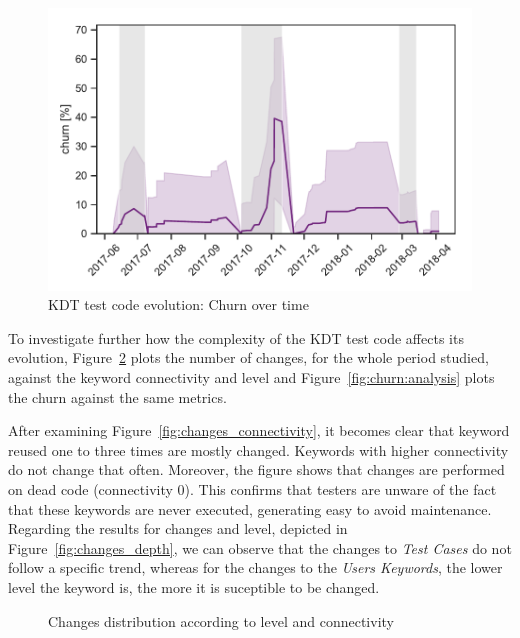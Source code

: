 \begin{figure}
\centering
\includegraphics[width=0.7\columnwidth]{figures/evolution/time_series_churn.pdf}
\caption{KDT test code evolution: Churn over time}  
\label{fig:churn}
\end{figure}

To investigate further how the complexity of the KDT test code affects its evolution, Figure~\ref{fig:changes} plots the number of changes, for the whole period studied, against the keyword connectivity and level and Figure~\ref{fig:churn:analysis} plots the churn against the same metrics.

After examining Figure~\ref{fig:changes_connectivity}, it becomes clear that keyword reused one to three times are mostly changed. Keywords with higher connectivity do not change that often. Moreover, the figure shows that changes are performed on dead code (connectivity 0). This confirms that testers are unware of the fact that these keywords are never executed, generating easy to avoid maintenance. Regarding the results for changes and level, depicted in Figure~\ref{fig:changes_depth}, we can observe that the changes to \emph{Test Cases} do not follow a specific trend, whereas for the changes to the \emph{Users Keywords}, the lower level the keyword is, the more it is suceptible to be changed.

\begin{figure}
\centering
{}
\caption{Changes distribution according to level and connectivity}  
\label{fig:changes}
\end{figure}

